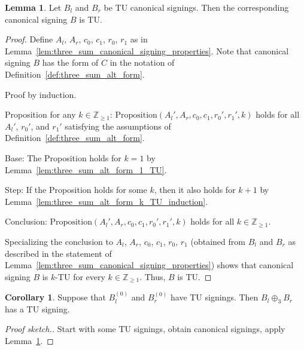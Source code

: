 \documentclass{article}
\theoremstyle{definition}
\newtheorem{lemma}[theorem]{Lemma}
\newtheorem{corollary}[theorem]{Corollary}
\begin{document}
\begin{lemma}\label{lem:three_sum_canonical_signing_TU}
    Let $B_{l}$ and $B_{r}$ be TU canonical signings. Then the corresponding canonical signing $B$ is TU.
\end{lemma}

\begin{proof}
    Define $A_{l}$, $A_{r}$, $c_{0}$, $c_{1}$, $r_{0}$, $r_{1}$ as in Lemma~\ref{lem:three_sum_canonical_signing_properties}. Note that canonical signing $B$ has the form of $C$ in the notation of Definition~\ref{def:three_sum_alt_form}.

    Proof by induction.

    Proposition for any $k \in \mathbb{Z}_{\geq 1}$: $\mathrm{Proposition}(A_{l}', A_{r}, c_{0}, c_{1}, r_{0}', r_{1}', k)$ holds for all $A_{l}'$, $r_{0}'$, and $r_{1}'$ satisfying the assumptions of Definition~\ref{def:three_sum_alt_form}.

    Base: The Proposition holds for $k = 1$ by Lemma~\ref{lem:three_sum_alt_form_1_TU}.

    Step: If the Proposition holds for some $k$, then it also holds for $k + 1$ by Lemma~\ref{lem:three_sum_alt_form_k_TU_induction}.

    Conclusion: $\mathrm{Proposition}(A_{l}', A_{r}, c_{0}, c_{1}, r_{0}', r_{1}', k)$ holds for all $k \in \mathbb{Z}_{\geq 1}$.

    Specializing the conclusion to $A_{l}$, $A_{r}$, $c_{0}$, $c_{1}$, $r_{0}$, $r_{1}$ (obtained from $B_{l}$ and $B_{r}$ as described in the statement of Lemma~\ref{lem:three_sum_canonical_signing_properties}) shows that canonical signing $B$ is $k$-TU for every $k \in \mathbb{Z}_{\geq 1}$. Thus, $B$ is TU.
\end{proof}

\begin{corollary}
    Suppose that $B_{l}^{(0)}$ and $B_{r}^{(0)}$ have TU signings. Then $B_{l} \oplus_{3} B_{r}$ has a TU signing.
\end{corollary}

\begin{proof}[Proof sketch.]
    Start with some TU signings, obtain canonical signings, apply Lemma~\ref{lem:three_sum_canonical_signing_TU}.
\end{proof}
\end{document}
